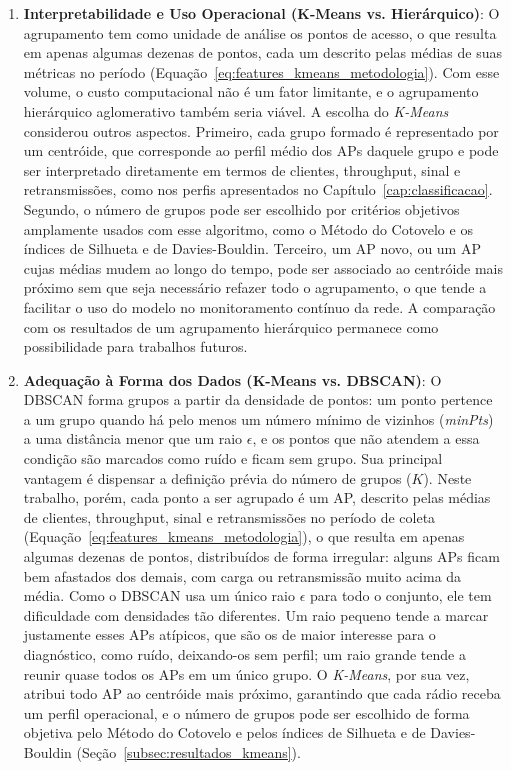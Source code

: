 \begin{enumerate}
    \item \textbf{Interpretabilidade e Uso Operacional (K-Means vs. Hierárquico)}: O agrupamento tem como unidade de análise os pontos de acesso, o que resulta em apenas algumas dezenas de pontos, cada um descrito pelas médias de suas métricas no período (Equação~\ref{eq:features_kmeans_metodologia}). Com esse volume, o custo computacional não é um fator limitante, e o agrupamento hierárquico aglomerativo também seria viável. A escolha do \textit{K-Means} considerou outros aspectos. Primeiro, cada grupo formado é representado por um centróide, que corresponde ao perfil médio dos APs daquele grupo e pode ser interpretado diretamente em termos de clientes, throughput, sinal e retransmissões, como nos perfis apresentados no Capítulo~\ref{cap:classificacao}. Segundo, o número de grupos pode ser escolhido por critérios objetivos amplamente usados com esse algoritmo, como o Método do Cotovelo e os índices de Silhueta e de Davies-Bouldin. Terceiro, um AP novo, ou um AP cujas médias mudem ao longo do tempo, pode ser associado ao centróide mais próximo sem que seja necessário refazer todo o agrupamento, o que tende a facilitar o uso do modelo no monitoramento contínuo da rede. A comparação com os resultados de um agrupamento hierárquico permanece como possibilidade para trabalhos futuros.
    
    \item \textbf{Adequação à Forma dos Dados (K-Means vs. DBSCAN)}: O DBSCAN forma grupos a partir da densidade de pontos: um ponto pertence a um grupo quando há pelo menos um número mínimo de vizinhos (\textit{minPts}) a uma distância menor que um raio $\epsilon$, e os pontos que não atendem a essa condição são marcados como ruído e ficam sem grupo. Sua principal vantagem é dispensar a definição prévia do número de grupos ($K$). Neste trabalho, porém, cada ponto a ser agrupado é um AP, descrito pelas médias de clientes, throughput, sinal e retransmissões no período de coleta (Equação~\ref{eq:features_kmeans_metodologia}), o que resulta em apenas algumas dezenas de pontos, distribuídos de forma irregular: alguns APs ficam bem afastados dos demais, com carga ou retransmissão muito acima da média. Como o DBSCAN usa um único raio $\epsilon$ para todo o conjunto, ele tem dificuldade com densidades tão diferentes. Um raio pequeno tende a marcar justamente esses APs atípicos, que são os de maior interesse para o diagnóstico, como ruído, deixando-os sem perfil; um raio grande tende a reunir quase todos os APs em um único grupo. O \textit{K-Means}, por sua vez, atribui todo AP ao centróide mais próximo, garantindo que cada rádio receba um perfil operacional, e o número de grupos pode ser escolhido de forma objetiva pelo Método do Cotovelo e pelos índices de Silhueta e de Davies-Bouldin (Seção~\ref{subsec:resultados_kmeans}).
\end{enumerate}

